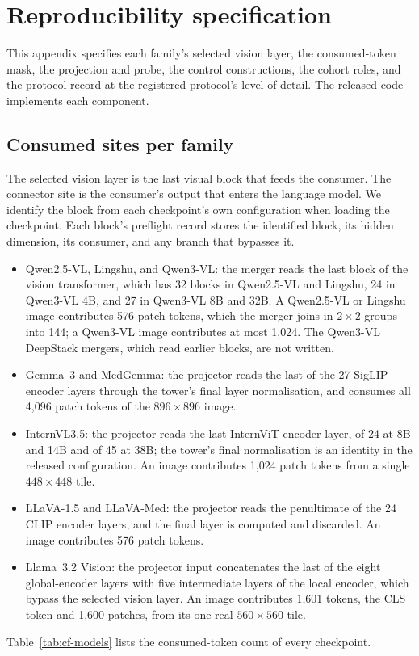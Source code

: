 \section{Reproducibility specification}
\label{app:repro}

This appendix specifies each family's selected vision layer, the consumed-token mask, the projection and probe, the control constructions, the cohort roles, and the protocol record at the registered protocol's level of detail. The released code implements each component.

\subsection{Consumed sites per family}
\label{app:repro-sites}

The selected vision layer is the last visual block that feeds the consumer. The connector site is the consumer's output that enters the language model. We identify the block from each checkpoint's own configuration when loading the checkpoint. Each block's preflight record stores the identified block, its hidden dimension, its consumer, and any branch that bypasses it.

\begin{itemize}[leftmargin=*,itemsep=1pt,topsep=2pt]
\item Qwen2.5-VL, Lingshu, and Qwen3-VL: the merger reads the last block of the vision transformer, which has 32 blocks in Qwen2.5-VL and Lingshu, 24 in Qwen3-VL 4B, and 27 in Qwen3-VL 8B and 32B. A Qwen2.5-VL or Lingshu image contributes 576 patch tokens, which the merger joins in $2\times2$ groups into 144; a Qwen3-VL image contributes at most 1{,}024. The Qwen3-VL DeepStack mergers, which read earlier blocks, are not written.
\item Gemma~3 and MedGemma: the projector reads the last of the 27 SigLIP encoder layers through the tower's final layer normalisation, and consumes all 4{,}096 patch tokens of the $896\times896$ image.
\item InternVL3.5: the projector reads the last InternViT encoder layer, of 24 at 8B and 14B and of 45 at 38B; the tower's final normalisation is an identity in the released configuration. An image contributes 1{,}024 patch tokens from a single $448\times448$ tile.
\item LLaVA-1.5 and LLaVA-Med: the projector reads the penultimate of the 24 CLIP encoder layers, and the final layer is computed and discarded. An image contributes 576 patch tokens.
\item Llama~3.2 Vision: the projector input concatenates the last of the eight global-encoder layers with five intermediate layers of the local encoder, which bypass the selected vision layer. An image contributes 1{,}601 tokens, the CLS token and 1{,}600 patches, from its one real $560\times560$ tile.
\end{itemize}
Table~\ref{tab:cf-models} lists the consumed-token count of every checkpoint.

